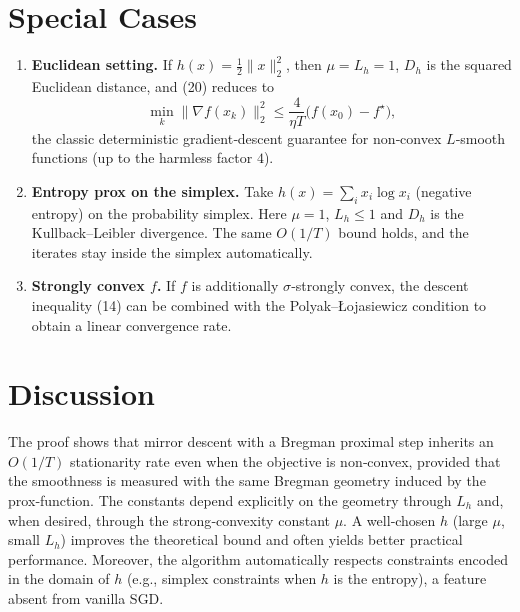 \documentclass{article}
\begin{document}
\section*{Special Cases}
\begin{enumerate}
\item \textbf{Euclidean setting.}
If $h(x)=\tfrac12\|x\|_2^{2}$, then $\mu=L_h=1$, $D_h$ is the squared
Euclidean distance, and (20) reduces to
\[
\min_{k}\|\nabla f(x_k)\|_2^{2}
\le \frac{4}{\eta T}\bigl(f(x_0)-f^\star\bigr),
\]
the classic deterministic gradient‑descent guarantee for
non‑convex $L$‑smooth functions (up to the harmless factor $4$).

\item \textbf{Entropy prox on the simplex.}
Take $h(x)=\sum_{i}x_i\log x_i$ (negative entropy) on the probability
simplex.  Here $\mu=1$, $L_h\le 1$ and $D_h$ is the Kullback–Leibler
divergence.  The same $O(1/T)$ bound holds, and the iterates stay
inside the simplex automatically.

\item \textbf{Strongly convex $f$.}
If $f$ is additionally $\sigma$‑strongly convex, the descent
inequality (14) can be combined with the Polyak–Łojasiewicz condition
to obtain a linear convergence rate.
\end{enumerate}

\section*{Discussion}
The proof shows that mirror descent with a Bregman proximal step
inherits an $O(1/T)$ stationarity rate even when the objective is
non‑convex, provided that the smoothness is measured with the same
Bregman geometry induced by the prox‑function.  The constants depend
explicitly on the geometry through $L_h$ and, when desired, through the
strong‑convexity constant $\mu$.  A well‑chosen $h$ (large $\mu$, small
$L_h$) improves the theoretical bound and often yields better practical
performance.  Moreover, the algorithm automatically respects constraints
encoded in the domain of $h$ (e.g., simplex constraints when $h$ is the
entropy), a feature absent from vanilla SGD.
\end{document}

